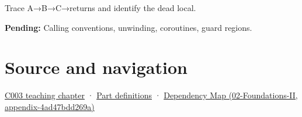 Trace A→B→C→returns and identify the dead local.

\textbf{Pending:} Calling conventions, unwinding, coroutines, guard regions.

\section{Source and navigation}\label{appendix-b081b7abe193-source-and-navigation}

\href{Continuous\%20Notes/Computing\%20Foundations\%20-\%20From\%20Bits\%20to\%20C++\%20and\%20Systems\%20APIs\#Where\%20the\%20bytes\%20live}{C003 teaching chapter} · \hyperref[appendix-fd090d982a15-m003---parts-41-60]{Part definitions} · \href{../02-Foundations-II/main.pdf\#nameddest=appendix-4ad47bdd269a}{Dependency Map (02-Foundations-II, appendix-4ad47bdd269a)}

